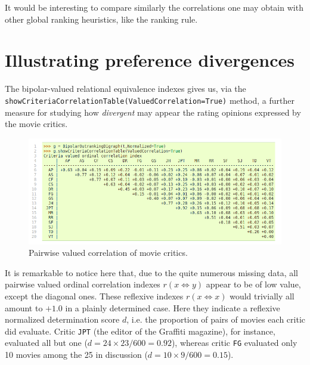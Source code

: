 It would be interesting to compare similarly the correlations one may obtain with other global ranking heuristics, like the \Copeland ranking rule.

\section{Illustrating preference divergences}
\label{sec:16.4}

The bipolar-valued relational equivalence indexes gives us, via the \texttt{showCriteriaCorrelationTable(ValuedCorrelation=True)} method, a further measure for studying how \emph{divergent} may appear the rating opinions expressed by the movie critics. 
\begin{figure}[h]
\includegraphics[width=12cm]{Figures/correlationTable.png}
\caption{Pairwise valued correlation of movie critics.} 
\label{fig:16.6}       %
\end{figure}

It is remarkable to notice here that, due to the quite numerous missing data, all pairwise valued ordinal correlation indexes $r(x\Leftrightarrow y)$ appear to be of low value, except the diagonal ones. These reflexive indexes $r(x\Leftrightarrow x)$ would trivially all amount to $+1.0$ in a plainly determined case. Here they indicate a reflexive normalized determination score $d$, i.e. the proportion of pairs of movies each critic did evaluate. Critic \texttt{JPT} (the editor of the Graffiti magazine), for instance, evaluated all but one ($d = 24\times23/600 = 0.92$), whereas critic \texttt{FG} evaluated only 10 movies among the 25 in discussion ($d = 10\times9/600 = 0.15$).

